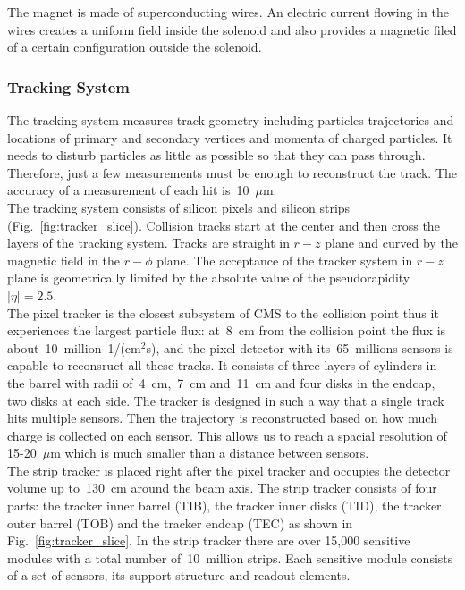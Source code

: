 The magnet is made of superconducting wires. An electric current flowing in the wires creates a uniform field inside the solenoid and also provides a magnetic filed of a certain configuration outside the solenoid.\\

\subsubsection{Tracking System}

The tracking system measures track geometry including particles trajectories and locations of primary and secondary vertices and momenta of charged particles. It needs to disturb particles as little as possible so that they can pass through. Therefore, just a few measurements must be enough to reconstruct the track. The accuracy of a measurement of each hit is~10~$\mu$m.\\

The tracking system consists of silicon pixels and silicon strips (Fig.~\ref{fig:tracker_slice}). Collision tracks start at the center and then cross the layers of the tracking system. Tracks are straight in $r-z$ plane and curved by the magnetic field in the $r-\phi$ plane. The acceptance of the tracker system in $r-z$ plane is geometrically limited by the absolute value of the pseudorapidity $|\eta|=2.5$.\\

The pixel tracker is the closest subsystem of CMS to the collision point thus it experiences the largest particle flux: at~8~cm from the collision point the flux is about~10~million~1/(cm$^2$s), and the pixel detector with its~65~millions sensors is capable to reconsruct all these tracks. It consists of three layers of cylinders in the barrel with radii of~4~cm,~7~cm and~11~cm and four disks in the endcap, two disks at each side. The tracker is designed in such a way that a single track hits multiple sensors. Then the trajectory is reconstructed based on how much charge is collected on each sensor. This allows us to reach a spacial resolution of 15-20~$\mu$m which is much smaller than a distance between sensors.\\

The strip tracker is placed right after the pixel tracker and occupies the detector volume up to~130~cm around the beam axis. The strip tracker consists of four parts: the tracker inner barrel (TIB), the tracker inner disks (TID), the tracker outer barrel (TOB) and the tracker endcap (TEC) as shown in Fig.~\ref{fig:tracker_slice}. In the strip tracker there are over 15,000 sensitive modules with a total number of~10~million strips. Each sensitive module consists of a set of sensors, its support structure and readout elements.\\

